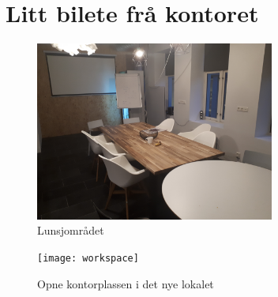 \documentclass[12pt]{article}
\begin{document}
\section{Litt bilete frå kontoret}

\begin{figure}[!h]
  \includegraphics[width=0.7\textwidth]{lunsj}
  \centering
  \caption{Lunsjområdet}
  \label{fig:lunsj1}
\end{figure}

\begin{figure}[!h]
  \texttt{[image: workspace]}
  \centering
  \caption{Opne kontorplassen i det nye lokalet}
  \label{fig:workspace1}
\end{figure}
\end{document}
